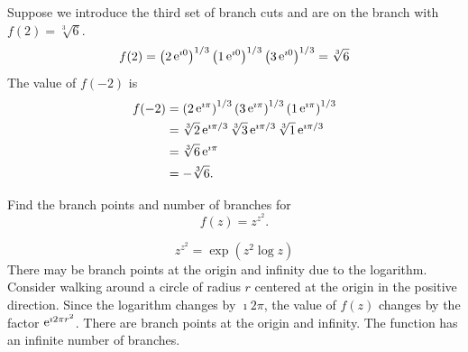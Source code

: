 \begin{Example}
  Suppose we introduce the third set of branch cuts and
  are on the branch with $f(2) = \sqrt[3]{6}$.
  \[ 
  f(2) = \left( 2 \mathop{\mathrm{e}}\nolimits^{\imath 0} \right)^{1/3}  \left( 1 \mathop{\mathrm{e}}\nolimits^{\imath 0} \right)^{1/3} 
  \left( 3 \mathop{\mathrm{e}}\nolimits^{\imath 0} \right)^{1/3} = \sqrt[3]{6}
  \]
  The value of $f(-2)$ is
  \begin{align*}
    f(-2)   
    &= \left( 2 \mathop{\mathrm{e}}\nolimits^{\imath \pi} \right)^{1/3}  \left( 3 \mathop{\mathrm{e}}\nolimits^{\imath \pi} \right)^{1/3}  
    \left( 1 \mathop{\mathrm{e}}\nolimits^{\imath \pi} \right)^{1/3} 
    \\
    &= \sqrt[3]{2} \mathop{\mathrm{e}}\nolimits^{\imath \pi/3} \sqrt[3]{3} \mathop{\mathrm{e}}\nolimits^{\imath \pi/3} \sqrt[3]{1} \mathop{\mathrm{e}}\nolimits^{\imath \pi/3} 
    \\
    &= \sqrt[3]{6} \mathop{\mathrm{e}}\nolimits^{\imath \pi} 
    \\
    &= -\sqrt[3]{6}.
  \end{align*}
\end{Example}






\begin{Example}
  Find the branch points and number of branches for
  \[ 
  f(z) = z^{z^2}. 
  \]

  \[
  z^{z^2} = \exp \left( z^2 \log z \right)
  \]
  There may be branch points at the origin and infinity due to the logarithm.
  Consider walking around a circle of radius $r$ centered at the origin in 
  the positive direction.   Since the logarithm changes by $\imath 2 \pi$, the value
  of $f(z)$ changes by the factor $\mathop{\mathrm{e}}\nolimits^{\imath 2 \pi r^2}$.  
  There are branch points at the origin and infinity.  The function has an
  infinite number of branches.
\end{Example}









